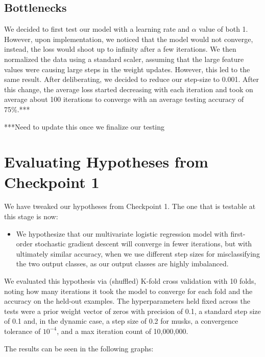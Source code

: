 \documentclass[12pt]{article}
\begin{document}
\subsection{Bottlenecks}

We decided to first test our model with a learning rate and $\alpha$ value of both 1. However, upon implementation, we noticed that the model would not converge, instead, the loss would shoot up to infinity after a few iterations. We then normalized the data using a standard scaler, assuming that the large feature values were causing large steps in the weight updates. However, this led to the same result. After deliberating, we decided to reduce our step-size to 0.001. After this change, the average loss started decreasing with each iteration and took on average about 100 iterations to converge with an average testing accuracy of 75\%.***

***Need to update this once we finalize our testing


\section{Evaluating Hypotheses from Checkpoint 1}

We have tweaked our hypotheses from Checkpoint 1. The one that is testable at this stage is now:

\begin{itemize}
    \item We hypothesize that our multivariate logistic regression model with first-order stochastic gradient descent will converge in fewer iterations, but with ultimately similar accuracy, when we use different step sizes for misclassifying the two output classes, as our output classes are highly imbalanced.
\end{itemize}

We evaluated this hypothesis via (shuffled) K-fold cross validation with 10 folds, noting how many iterations it took the model to converge for each fold and the accuracy on the held-out examples. The hyperparameters held fixed across the tests were a prior weight vector of zeros with precision of 0.1, a standard step size of 0.1 and, in the dynamic case, a step size of 0.2 for musks, a convergence tolerance of $10^{-4}$, and a max iteration count of 10,000,000.

The results can be seen in the following graphs:
\end{document}
